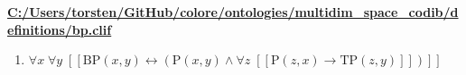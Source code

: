\documentclass{article}
\begin{document}
\textbf{\url{C:/Users/torsten/GitHub/colore/ontologies/multidim\_space\_codib/definitions/bp.clif}}

\begin{enumerate}
\item $\forall x\; \forall y\;  \left[ \left[ \textrm{BP}(x,y) \leftrightarrow \left(\textrm{P}(x,y) \land \forall z\;  \left[ \left[ \textrm{P}(z,x) \rightarrow \textrm{TP}(z,y) \right] \right]\right) \right] \right]$
\end{enumerate}
\end{document}
